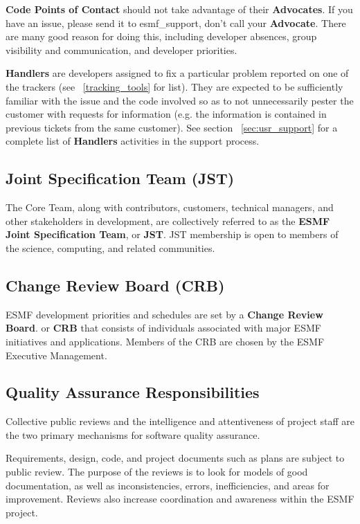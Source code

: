 {\bf Code Points of Contact} should not take advantage of their {\bf Advocates}. If you have an issue, 
please send it to esmf\_support, don't call your {\bf Advocate}. There are many good reason for doing this, including developer absences, group visibility and communication, and developer priorities.

{\bf Handlers} are developers assigned to fix a particular problem reported on one of the trackers (see 
~\ref{tracking_tools} for list). They are expected to be sufficiently familiar with the issue and the
code involved so as to not unnecessarily pester the customer with requests for information (e.g. the
information is contained in previous tickets from the same customer). See section ~\ref{sec:usr_support} for
a complete list of {\bf Handlers} activities in the support process.  

\subsection{Joint Specification Team (JST)}
The Core Team, along with contributors, customers, technical
managers, and other stakeholders in development, are collectively
referred to as the {\bf ESMF Joint Specification Team}, or {\bf JST}.  
JST membership is open to members of the science, computing, and
related communities.


\subsection{Change Review Board (CRB)}
\label{crb}
ESMF development priorities and schedules are set by a 
{\bf Change Review Board}. or {\bf CRB} that consists of individuals
associated with major ESMF initiatives and applications.  
Members of the CRB are chosen by the ESMF Executive Management.

\subsection{Quality Assurance Responsibilities}

Collective public reviews and the intelligence and attentiveness of
project staff are the two primary mechanisms for software quality assurance.  

Requirements, design, code, and project documents such as plans
are subject to public review.  The purpose of the reviews is
to look for models of good documentation, as well as inconsistencies,
errors, inefficiencies, and areas for improvement.  Reviews also
increase coordination and awareness within the ESMF project.

